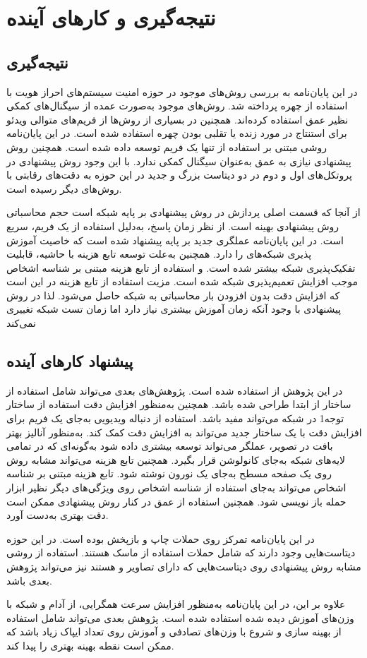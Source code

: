 \chapter{نتیجه‌گیری و کارهای آینده}
\section{نتیجه‌گیری}
در این پایان‌نامه به بررسی روش‌های موجود در حوزه امنیت سیستم‌های احراز هویت با استفاده از چهره پرداخته شد. روش‌های موجود به‌صورت عمده از سیگنال‌های کمکی نظیر عمق استفاده کرده‌اند. همچنین در بسیاری از روش‌ها از فریم‌های متوالی ویدئو برای استنتاج در مورد زنده یا تقلبی بودن چهره استفاده شده است. در این پایان‌نامه روشی مبتنی بر استفاده از تنها یک فریم توسعه داده شده است. همچنین روش پیشنهادی نیازی به عمق به‌عنوان سیگنال کمکی ندارد. با این وجود روش پیشنهادی در پروتکل‌های اول و دوم در دو دیتاست بزرگ و جدید در این حوزه به دقت‌های رقابتی با روش‌های دیگر رسیده است.

از آنجا که قسمت اصلی پردازش در روش پیشنهادی بر پایه شبکه  است حجم محاسباتی روش پیشنهادی بهینه است. از نظر زمان پاسخ، به‌دلیل استفاده از یک فریم، سریع است.
در این پایان‌نامه عملگری جدید بر پایه  پیشنهاد شده است که خاصیت آموزش پذیری شبکه‌های  را دارد. همچنین به‌علت توسعه تابع هزینه با حاشیه، قابلیت تفکیک‌پذیری شبکه بیشتر شده است. و استفاده از تابع هزینه مبتنی بر شناسه اشخاص موجب افزایش تعمیم‌پذیری شبکه شده است. مزیت استفاده از تابع هزینه در این است که افزایش دقت بدون افزودن بار محاسباتی به شبکه حاصل می‌شود. لذا در روش پیشنهادی با وجود آنکه زمان آموزش بیشتری نیاز دارد اما زمان تست شبکه تغییری نمی‌کند
\section{پیشنهاد کارهای آینده}
در این پژوهش از  استفاده شده است. پژوهش‌های بعدی می‌تواند شامل استفاده از ساختار از ابتدا طراحی شده باشد. همچنین به‌منظور افزایش دقت استفاده از ساختار توجه1 در شبکه می‌تواند مفید باشد. استفاده از دنباله ویدیویی به‌جای یک فریم برای افزایش دقت با یک ساختار جدید می‌تواند به افزایش دقت کمک کند. به‌منظور آنالیز بهتر بافت در تصویر، عملگر  می‌تواند توسعه بیشتری داده شود به‌گونه‌ای که در تمامی لایه‌های شبکه به‌جای کانولوشن قرار بگیرد. همچنین تابع هزینه  می‌تواند مشابه روش
\cite{george2019deep}
روی یک صفحه مسطح به‌جای یک نورون نوشته شود. تابع هزینه مبتنی بر شناسه اشخاص می‌تواند به‌جای استفاده از شناسه اشخاص روی ویژگی‌های دیگر نظیر ابزار حمله باز نویسی شود. همچنین استفاده از عمق در کنار روش پیشنهادی ممکن است دقت بهتری به‌دست آورد.

در این پایان‌نامه تمرکز روی حملات چاپ و بازپخش بوده است. در این حوزه دیتاست‌هایی وجود دارند که شامل حملات استفاده از ماسک هستند. استفاده از روشی مشابه روش پیشنهادی روی دیتاست‌هایی که دارای تصاویر  و  هستند نیز می‌تواند پژوهش بعدی باشد.

علاوه بر این، در این پایان‌نامه به‌منظور افزایش سرعت همگرایی، از آدام و شبکه با وزن‌های آموزش دیده شده استفاده شده است. پژوهش بعدی می‌تواند شامل استفاده از بهینه سازی  و شروع با وزن‌های تصادفی و آموزش روی تعداد ایپاک زیاد باشد که ممکن است نقطه بهینه بهتری را پیدا کند.
